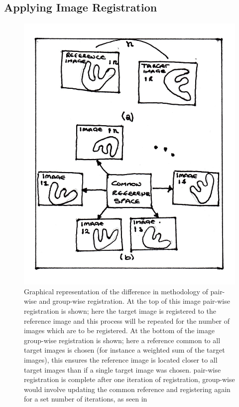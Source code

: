         \subsection{Applying Image Registration} \label{sec:applying_image_registration}
            \begin{figure}
                \centering
                        
                \includegraphics[width=0.9\linewidth]{figures/background_applying_image_registration_pairwise_groupwise_comparison.png}
                        
                \captionsetup{singlelinecheck=false, justification=raggedright}
                \caption{Graphical representation of the difference in methodology of pair-wise and group-wise registration. At the top of this image pair-wise registration is shown; here the target image is registered to the reference image and this process will be repeated for the number of images which are to be registered. At the bottom of the image group-wise registration is shown; here a reference common to all target images is chosen (for instance a weighted sum of the target images), this ensures the reference image is located closer to all target images than if a single target image was chosen. pair-wise registration is complete after one iteration of registration, group-wise would involve updating the common reference and registering again for a set number of iterations, as seen in~} \label{fig:applying_image_registration_pair-wise_group-wise_comparison}
            \end{figure}
            
